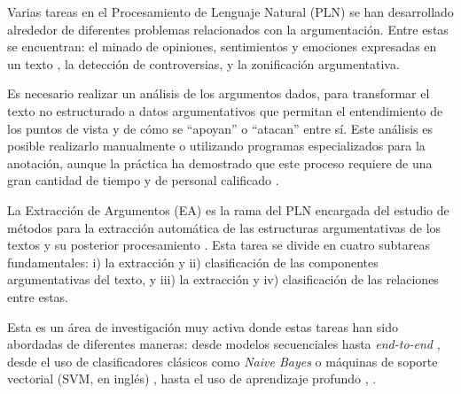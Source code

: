 \documentclass[a4paper,11pt,twocolumn,twoside]{article}
\begin{document}

Varias tareas en el Procesamiento de Lenguaje Natural (PLN) se han desarrollado alrededor
de diferentes problemas relacionados con 
la argumentación. Entre estas se encuentran: el minado de opiniones, sentimientos y 
emociones expresadas en un texto 
\cite{liu2010sentiment}, la detección de controversias, y la zonificación
argumentativa. 

Es necesario realizar un 
análisis de los argumentos dados, para transformar el texto no estructurado a datos argumentativos 
que permitan el entendimiento de los puntos de vista y de cómo se ``apoyan'' o ``atacan'' entre sí. Este análisis
es posible realizarlo manualmente o utilizando programas
especializados para la anotación, aunque la práctica ha demostrado que este proceso requiere 
de una gran cantidad de tiempo y de personal calificado \cite{eger2018cross}. 


La Extracción de Argumentos (EA) es la rama del PLN encargada
del estudio de métodos para la extracción automática de las estructuras argumentativas de 
los textos y su posterior procesamiento \cite{lawrence2020argument}. Esta tarea se divide en 
cuatro subtareas fundamentales: i) la extracción y ii) clasificación de las componentes 
argumentativas del texto, y iii) la extracción y 
iv) clasificación de las relaciones entre estas. 

Esta es un área de investigación muy activa donde estas tareas han sido abordadas de diferentes maneras:
desde modelos secuenciales \cite{palau2009argumentation,goudas2015argument} hasta 
\textit{end-to-end} \cite{eger2017neural}, desde el uso de clasificadores clásicos 
como \textit{Naive Bayes} o máquinas de soporte vectorial (SVM, en inglés) \cite{niculae2017argument}, \cite{stab2017parsing} hasta el uso de 
aprendizaje profundo \cite{galassi2021deep}, \cite{mayer2020transformer}.
\end{document}
